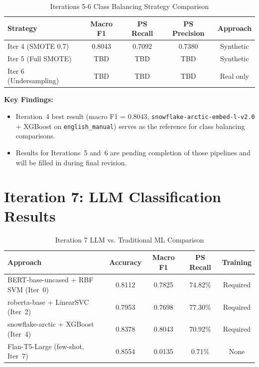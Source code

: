 \documentclass[11pt, titlepage, bibliography=totoc]{scrreprt}
\begin{document}
\begin{table}[htbp]
\centering
\caption{Iterations 5-6 Class Balancing Strategy Comparison}
\label{tab:results-iter5-6}
\begin{tabular}{@{}lcccc@{}}
\toprule
\textbf{Strategy} & \textbf{Macro F1} & \textbf{PS Recall} & \textbf{PS Precision} & \textbf{Approach} \\
\midrule
Iter 4 (SMOTE 0.7) & 0.8043 & 0.7092 & 0.7380 & Synthetic \\
Iter 5 (Full SMOTE) & TBD & TBD & TBD & Synthetic \\
Iter 6 (Undersampling) & TBD & TBD & TBD & Real only \\
\bottomrule
\end{tabular}
\end{table}

\textbf{Key Findings:}
\begin{itemize}
    \item Iteration~4 best result (macro F1 = 0.8043, \texttt{snowflake-arctic-embed-l-v2.0} + XGBoost on \texttt{english\_manual}) serves as the reference for class balancing comparisons.
    \item Results for Iterations~5 and~6 are pending completion of those pipelines and will be filled in during final revision.
\end{itemize}

\section{Iteration 7: LLM Classification Results}

\begin{table}[htbp]
\centering
\caption{Iteration 7 LLM vs. Traditional ML Comparison}
\label{tab:results-iter7}
\begin{tabular}{@{}lcccc@{}}
\toprule
\textbf{Approach} & \textbf{Accuracy} & \textbf{Macro F1} & \textbf{PS Recall} & \textbf{Training} \\
\midrule
BERT-base-uncased + RBF SVM (Iter~0)   & 0.8112 & 0.7825 & 74.82\% & Required \\
roberta-base + LinearSVC (Iter~2)      & 0.7953 & 0.7698 & 77.30\% & Required \\
snowflake-arctic + XGBoost (Iter~4)    & 0.8378 & 0.8043 & 70.92\% & Required \\
Flan-T5-Large (few-shot, Iter~7)       & 0.8554 & 0.0135 & 0.71\%  & None \\
\bottomrule
\end{tabular}
\end{table}
\end{document}
